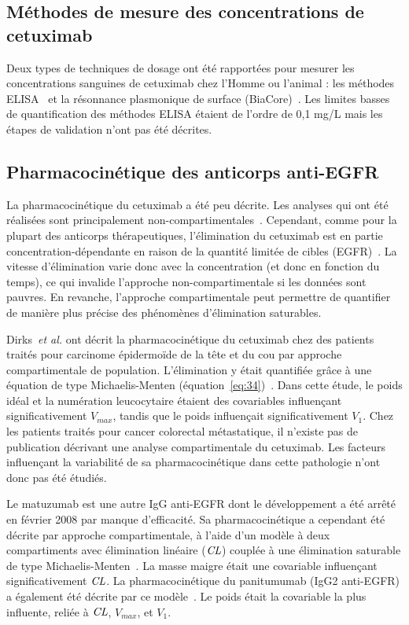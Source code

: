 \subsection{Méthodes de mesure des concentrations de cetuximab}
Deux types de techniques de dosage ont été rapportées pour mesurer les concentrations sanguines de cetuximab chez l'Homme ou l'animal : les méthodes ELISA~\citep{REF122, REF123, REF124} et la résonnance plasmonique de surface (BiaCore)~\citep{REF125}. Les limites basses de quantification des méthodes ELISA étaient de l'ordre de 0,1 mg/L mais les étapes de validation n'ont pas été décrites.

\subsection{Pharmacocinétique des anticorps anti-EGFR}
La pharmacocinétique du cetuximab a été peu décrite. Les analyses qui ont été réalisées sont principalement non-compartimentales~\citep{REF118, REF122, REF126}. Cependant, comme pour la plupart des anticorps thérapeutiques, l'élimination du cetuximab est en partie concentration-dépendante en raison de la quantité limitée de cibles (EGFR)~\citep{REF123, REF127, REF128}. La vitesse d'élimination varie donc avec la concentration (et donc en fonction du temps), ce qui invalide l'approche non-compartimentale si les données sont pauvres. En revanche, l'approche compartimentale peut permettre de quantifier de manière plus précise des phénomènes d'élimination saturables.

Dirks~\textit{et al.} ont décrit la pharmacocinétique du cetuximab chez des patients traités pour carcinome épidermoïde de la tête et du cou par approche compartimentale de population. L'élimination y était quantifiée grâce à une équation de type Michaelis-Menten (équation~\ref{eq:34})~\citep{REF68}. Dans cette étude, le poids idéal et la numération leucocytaire étaient des covariables influençant significativement $V_{max}$, tandis que le poids influençait significativement $V_1$. Chez les patients traités pour cancer colorectal métastatique, il n'existe pas de publication décrivant une analyse compartimentale du cetuximab. Les facteurs influençant la variabilité de sa pharmacocinétique dans cette pathologie n'ont donc pas été étudiés.

Le matuzumab est une autre IgG anti-EGFR dont le développement a été arrêté en février 2008 par manque d'efficacité. Sa pharmacocinétique a cependant été décrite par approche compartimentale, à l'aide d'un modèle à deux compartiments avec élimination linéaire ($\operatorname{\textit{CL}}$) couplée à une élimination saturable de type Michaelis-Menten~\citep{REF72, REF129}. La masse maigre était une covariable influençant significativement $\operatorname{\textit{CL}}$. La pharmacocinétique du panitumumab (IgG2 anti-EGFR) a également été décrite par ce modèle~\citep{REF73}. Le poids était la covariable la plus influente, reliée à $\operatorname{\textit{CL}}$, $V_{max}$, et $V_1$.


